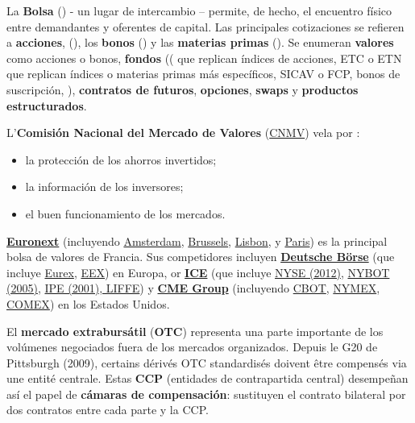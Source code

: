 \def\scaleBS{.95}

\begin{f}
	
La \textbf{Bolsa} () - un lugar de intercambio – permite, de hecho, el encuentro físico entre demandantes y oferentes de capital.
Las principales cotizaciones se refieren a \textbf{acciones}, (), los \textbf{bonos} () y las \textbf{materias primas} ().
Se enumeran \textbf{valores} como acciones o bonos, \textbf{fondos} (( que replican índices de acciones, ETC o ETN que replican índices o materias primas más específicos, SICAV o FCP, bonos de suscripción, ), \textbf{contratos de futuros}, \textbf{opciones}, \textbf{swaps} y \textbf{productos estructurados}.

L'\textbf{Comisión Nacional del Mercado de Valores} (\href{https://www.cnmv.es/Portal/home}{CNMV}) vela por :
\begin{itemize}
	\item la protección de los ahorros invertidos;
	\item la información de los inversores;
	\item el buen funcionamiento de los mercados.
\end{itemize}

\textbf{\href{https://www.euronext.com/fr}{Euronext}} (incluyendo
\href{https://www.euronext.com/en/markets/amsterdam}{Amsterdam}, 
\href{https://www.euronext.com/en/markets/brussels}{Brussels}, 
\href{https://www.euronext.com/en/markets/lisbon}{Lisbon}, 
y \href{https://www.euronext.com/en/markets/paris}{Paris}) es la principal bolsa de valores de Francia. 
%
Sus competidores incluyen \textbf{\href{https://www.deutsche-boerse.com/dbg-en/}{Deutsche Börse}} 
(que incluye \href{https://www.eurex.com/}{Eurex}, 
\href{https://www.eex.com/en/}{EEX}) en Europa, 
%
or \textbf{\href{https://www.ice.com/}{ICE}} (que incluye
\href{https://www.nyse.com/index}{NYSE (2012)}, 
\href{https://www.ice.com/about/history}{NYBOT (2005)}, 
\href{https://www.ice.com/futures-europe}{IPE (2001), LIFFE}) 
%
y \textbf{\href{https://www.cmegroup.com/}{CME Group}} (incluyendo
\href{https://www.cmegroup.com/company/cbot.html}{CBOT}, 
\href{https://www.cmegroup.com/company/nymex.html}{NYMEX}, 
\href{https://www.cmegroup.com/company/comex.html}{COMEX}) en los Estados Unidos.

El \textbf{mercado extrabursátil} (\textbf{OTC}) representa una parte importante de los volúmenes negociados fuera de los mercados organizados.
Depuis le G20 de Pittsburgh (2009), certains dérivés OTC standardisés doivent être compensés via une entité centrale.
Estas \textbf{CCP} (entidades de contrapartida central) desempeñan así el papel de \textbf{cámaras de compensación}: sustituyen el contrato bilateral por dos contratos entre cada parte y la CCP.


\end{f}
